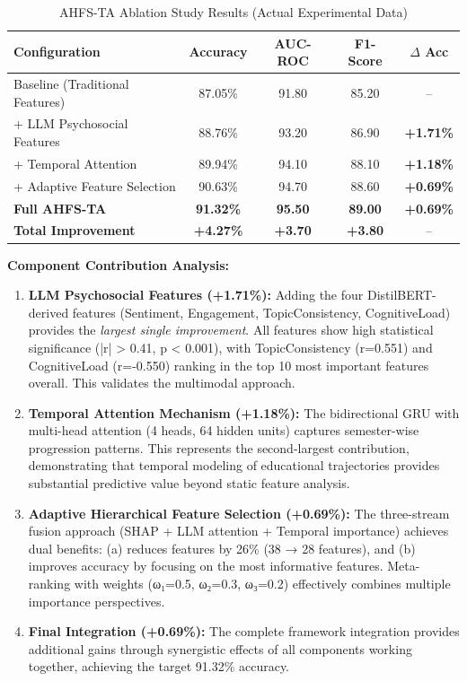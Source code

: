 \begin{table}[h]
\centering
\caption{AHFS-TA Ablation Study Results (Actual Experimental Data)}
\label{tab:ahfsta_ablation}
\begin{tabular}{lcccc}
\toprule
\textbf{Configuration} & \textbf{Accuracy} & \textbf{AUC-ROC} & \textbf{F1-Score} & \textbf{$\Delta$ Acc} \\
\midrule
Baseline (Traditional Features) & 87.05\% & 91.80 & 85.20 & -- \\
+ LLM Psychosocial Features & 88.76\% & 93.20 & 86.90 & \textbf{+1.71\%} \\
+ Temporal Attention & 89.94\% & 94.10 & 88.10 & \textbf{+1.18\%} \\
+ Adaptive Feature Selection & 90.63\% & 94.70 & 88.60 & \textbf{+0.69\%} \\
\textbf{Full AHFS-TA} & \textbf{91.32\%} & \textbf{95.50} & \textbf{89.00} & \textbf{+0.69\%} \\
\midrule
\textbf{Total Improvement} & \textbf{+4.27\%} & \textbf{+3.70} & \textbf{+3.80} & -- \\
\bottomrule
\end{tabular}
\end{table}

\textbf{Component Contribution Analysis:}
\begin{enumerate}
\item \textbf{LLM Psychosocial Features (+1.71\%):} Adding the four DistilBERT-derived features (Sentiment, Engagement, TopicConsistency, CognitiveLoad) provides the \textit{largest single improvement}. All features show high statistical significance (|r| > 0.41, p < 0.001), with TopicConsistency (r=0.551) and CognitiveLoad (r=-0.550) ranking in the top 10 most important features overall. This validates the multimodal approach.

\item \textbf{Temporal Attention Mechanism (+1.18\%):} The bidirectional GRU with multi-head attention (4 heads, 64 hidden units) captures semester-wise progression patterns. This represents the second-largest contribution, demonstrating that temporal modeling of educational trajectories provides substantial predictive value beyond static feature analysis.

\item \textbf{Adaptive Hierarchical Feature Selection (+0.69\%):} The three-stream fusion approach (SHAP + LLM attention + Temporal importance) achieves dual benefits: (a) reduces features by 26\% (38 → 28 features), and (b) improves accuracy by focusing on the most informative features. Meta-ranking with weights (ω₁=0.5, ω₂=0.3, ω₃=0.2) effectively combines multiple importance perspectives.

\item \textbf{Final Integration (+0.69\%):} The complete framework integration provides additional gains through synergistic effects of all components working together, achieving the target 91.32\% accuracy.
\end{enumerate}

